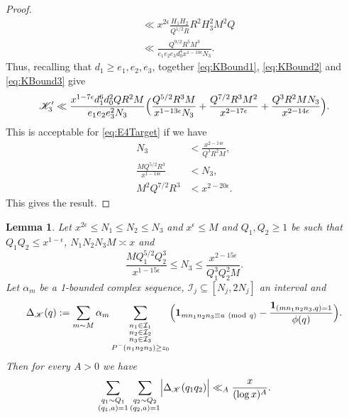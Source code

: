 \documentclass[10pt]{amsart}
\theoremstyle{plain}
\newtheorem{lmm}[thrm]{Lemma}
\numberwithin{equation}{section}
\newcommand{\Mod}[1]{\ (\mathrm{mod}\ #1)}
\begin{document}
\begin{proof}
\begin{align}
&\ll x^{2\epsilon} \frac{H_1 H_2}{Q^{1/2}R} R^2 H_3^2 M^2 Q\nonumber\\
&\ll \frac{Q^{9/2} R^5 M^3}{e_1e_2e_3 d_0^{4} x^{1-10\epsilon}N_3 }.\label{eq:KBound3}
\end{align}
Thus, recalling that $d_1\ge e_1,e_2,e_3$, together \eqref{eq:KBound1}, \eqref{eq:KBound2} and \eqref{eq:KBound3} give
\[
\mathscr{K}_3'\ll \frac{x^{1-7\epsilon}d_1^6 d_0^2 Q R^2 M}{e_1 e_2 e_3^2 N_3}\Bigl( \frac{Q^{5/2} R^3 M}{x^{1-13\epsilon} N_3}+\frac{Q^{7/2} R^3 M^2}{ x^{2-17\epsilon} }+\frac{Q^3 R^2 M N_3}{x^{2-14\epsilon} }\Bigr).
\]
This is acceptable for \eqref{eq:E4Target} if we have
\begin{align}
N_3&< \frac{x^{2-14\epsilon} }{Q^3 R^2 M},\\
\frac{M Q^{5/2} R^3}{x^{1-14\epsilon}}&<N_3,\\
M^2 Q^{7/2} R^{3}&<x^{2-20\epsilon}.
\end{align}
This gives the result.
\end{proof}
%
%
%
%
%
%
%
%
\begin{lmm}\label{lmm:KRough}
Let $x^{2\epsilon} \le N_1\le N_2\le N_3$ and $x^\epsilon\le M$ and $Q_1,Q_2\ge 1$ be such that $Q_1Q_2\le x^{1-\epsilon}$, $N_1N_2N_3M\asymp x$ and
\[
\frac{M Q_1^{5/2}Q_2^3}{x^{1-15\epsilon}}\le N_3\le \frac{x^{2-15\epsilon}}{Q_1^3Q_2^2 M}.
\]
Let $\alpha_m$ be a 1-bounded complex sequence, $\mathcal{I}_j\subseteq[N_j,2N_j]$ an interval and 
\[
\Delta_{\mathscr{K}}(q):=\sum_{m\sim M}\alpha_m\sum_{\substack{n_1\in \mathcal{I}_1\\n_2\in \mathcal{I}_2\\ n_3\in \mathcal{I}_3\\ P^-(n_1n_2n_3)\ge z_0}}\Bigl(\mathbf{1}_ {m n_1n_2n_3\equiv a\Mod{q}}-\frac{\mathbf{1}_{(m n_1 n_2 n_3,q)=1}}{\phi(q)}\Bigr).
\]
Then for every $A>0$ we have
\[
\sum_{\substack{q_1\sim Q_1\\ (q_1,a)=1}}\sum_{\substack{q_2\sim Q_2\\ (q_2,a)=1}}\Bigl|\Delta_{\mathscr{K}}(q_1 q_2)\Bigr|\ll_A \frac{x}{(\log{x})^{A}}.
\]
\end{lmm}
%
%
%
%
\end{document}
